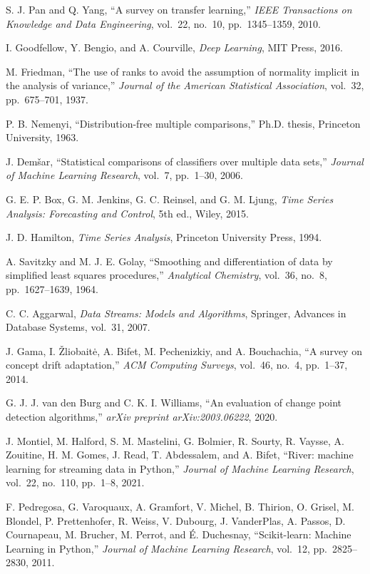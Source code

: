 \documentclass[journal,article,submit,pdftex,moreauthors]{Definitions/mdpi}
\begin{document}
S. J. Pan and Q. Yang, ``A survey on transfer learning,'' \textit{IEEE Transactions on Knowledge and Data Engineering}, vol.~22, no.~10, pp.~1345--1359, 2010.

I. Goodfellow, Y. Bengio, and A. Courville, \textit{Deep Learning}, MIT Press, 2016.

M. Friedman, ``The use of ranks to avoid the assumption of normality implicit in the analysis of variance,'' \textit{Journal of the American Statistical Association}, vol.~32, pp.~675--701, 1937.

P. B. Nemenyi, ``Distribution-free multiple comparisons,'' Ph.D. thesis, Princeton University, 1963.

J. Demšar, ``Statistical comparisons of classifiers over multiple data sets,'' \textit{Journal of Machine Learning Research}, vol.~7, pp.~1--30, 2006.

G. E. P. Box, G. M. Jenkins, G. C. Reinsel, and G. M. Ljung, \textit{Time Series Analysis: Forecasting and Control}, 5th ed., Wiley, 2015.

J. D. Hamilton, \textit{Time Series Analysis}, Princeton University Press, 1994.

A. Savitzky and M. J. E. Golay, ``Smoothing and differentiation of data by simplified least squares procedures,'' \textit{Analytical Chemistry}, vol.~36, no.~8, pp.~1627--1639, 1964.

C. C. Aggarwal, \textit{Data Streams: Models and Algorithms}, Springer, Advances in Database Systems, vol.~31, 2007.

J. Gama, I. Žliobaitė, A. Bifet, M. Pechenizkiy, and A. Bouchachia, ``A survey on concept drift adaptation,'' \textit{ACM Computing Surveys}, vol.~46, no.~4, pp.~1--37, 2014.

G. J. J. van den Burg and C. K. I. Williams, ``An evaluation of change point detection algorithms,'' \textit{arXiv preprint arXiv:2003.06222}, 2020.

J. Montiel, M. Halford, S. M. Mastelini, G. Bolmier, R. Sourty, R. Vaysse, A. Zouitine, H. M. Gomes, J. Read, T. Abdessalem, and A. Bifet, ``River: machine learning for streaming data in Python,'' \textit{Journal of Machine Learning Research}, vol.~22, no.~110, pp.~1--8, 2021.

F. Pedregosa, G. Varoquaux, A. Gramfort, V. Michel, B. Thirion, O. Grisel, M. Blondel, P. Prettenhofer, R. Weiss, V. Dubourg, J. VanderPlas, A. Passos, D. Cournapeau, M. Brucher, M. Perrot, and É. Duchesnay, ``Scikit-learn: Machine Learning in Python,'' \textit{Journal of Machine Learning Research}, vol.~12, pp.~2825--2830, 2011.
\end{document}
